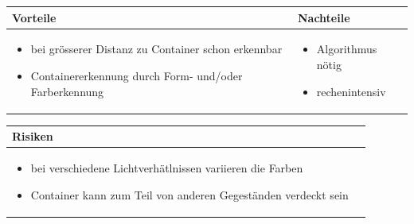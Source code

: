\begin{table}[h]
\begin{tabular}{p{} | p{}}


\textbf{Vorteile} & \textbf{Nachteile} \\ \hline
	 
\begin{itemize}
\item bei grösserer Distanz zu Container schon erkennbar
\item Containererkennung durch Form- und/oder Farberkennung
\end{itemize}

 
 &
 
\begin{itemize}
\item Algorithmus nötig
\item rechenintensiv
\end{itemize}

\end{tabular}
\end{table}

\begin{table}[h]
\begin{tabular}{p{}p{}}

\textbf{Risiken} & \\ \hline
	 
\begin{itemize}
\item bei verschiedene Lichtverhätlnissen variieren die Farben
\item Container kann zum Teil von anderen Gegeständen verdeckt sein
\end{itemize}

 
\end{tabular}
\end{table}

\pagebreak
